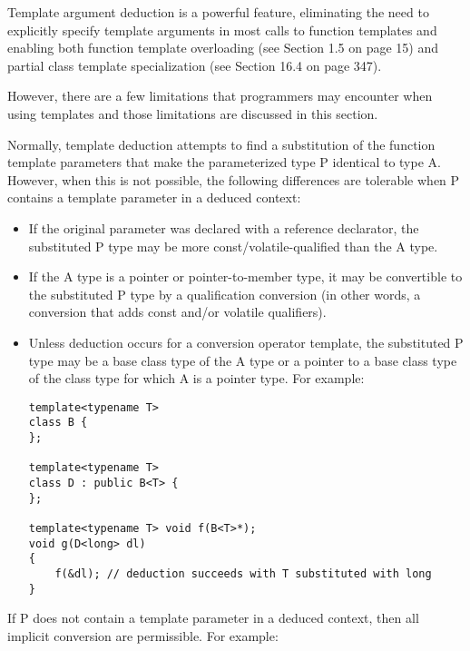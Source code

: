 

Template argument deduction is a powerful feature, eliminating the need to explicitly specify template arguments in most calls to function templates and enabling both function template overloading (see Section 1.5 on page 15) and partial class template specialization (see Section 16.4 on page 347).

However, there are a few limitations that programmers may encounter when using templates and those limitations are discussed in this section.


Normally, template deduction attempts to find a substitution of the function template parameters that make the parameterized type P identical to type A. However, when this is not possible, the following differences are tolerable when P contains a template parameter in a deduced context:

\begin{itemize}
\item 
If the original parameter was declared with a reference declarator, the substituted P type may be more const/volatile-qualified than the A type.

\item 
If the A type is a pointer or pointer-to-member type, it may be convertible to the substituted P type by a qualification conversion (in other words, a conversion that adds const and/or volatile qualifiers).

\item 
Unless deduction occurs for a conversion operator template, the substituted P type may be a base class type of the A type or a pointer to a base class type of the class type for which A is a pointer type. For example:

\begin{lstlisting}[style=styleCXX]
template<typename T>
class B {
};

template<typename T>
class D : public B<T> {
};

template<typename T> void f(B<T>*);
void g(D<long> dl)
{
	f(&dl); // deduction succeeds with T substituted with long
}
\end{lstlisting}
\end{itemize}

If P does not contain a template parameter in a deduced context, then all implicit conversion are permissible. For example:


